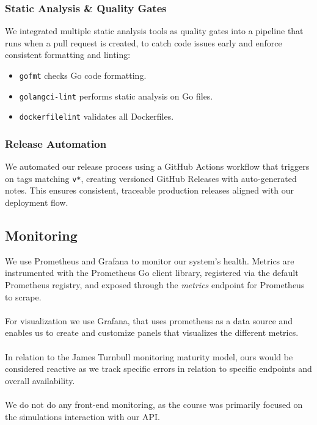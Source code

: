 \subsubsection*{Static Analysis \& Quality Gates}

We integrated multiple static analysis tools as quality gates into a pipeline that runs when a pull request is created, to catch code issues early and enforce consistent formatting and linting:
\begin{itemize}
  \item \texttt{gofmt} checks Go code formatting.
  \item \texttt{golangci-lint} performs static analysis on Go files.
  \item \texttt{dockerfilelint} validates all Dockerfiles.
\end{itemize}

\subsubsection*{Release Automation}

We automated our release process using a GitHub Actions workflow that triggers on tags matching \texttt{v*}, creating versioned GitHub Releases with auto-generated notes. This ensures consistent, traceable production releases aligned with our deployment flow.

\subsection{Monitoring}
\label{sec:monitoring}
We use Prometheus and Grafana to monitor our system’s health. Metrics are instrumented with the Prometheus Go client library, registered via the default Prometheus registry, and exposed through the \textit{metrics} endpoint for Prometheus to scrape. \\ \\ 
For visualization we use Grafana, that uses prometheus as a data source and enables us to create and customize panels that visualizes the different metrics. \\\\ 
In relation to the James Turnbull monitoring maturity model\cite{turnbull2015monitoring}, ours would be considered reactive as we track specific errors in relation to specific endpoints and overall availability.\\\\
We do not do any front-end monitoring, as the course was primarily focused on the simulations interaction with our API.
